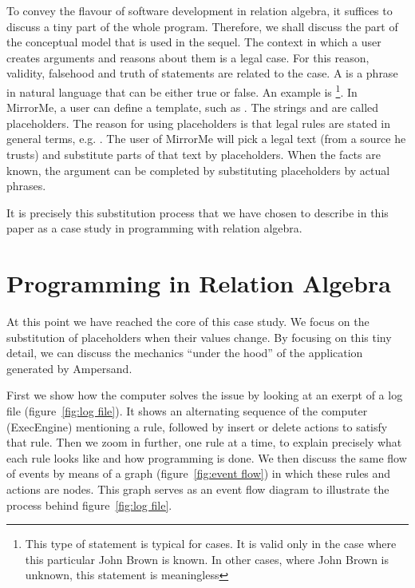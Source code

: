 \documentclass{elsarticle}
\begin{document}
	To convey the flavour of software development in relation algebra, it suffices to discuss a tiny part of the whole program.
	Therefore, we shall discuss the part of the conceptual model that is used in the sequel.
	The context in which a user creates arguments and reasons about them is a legal case.
	For this reason, validity, falsehood and truth of statements are related to the case.
	A  is a phrase in natural language that can be either true or false.
	An example is %
\footnote{This type of statement is typical for cases. It is valid only in the case where this particular John Brown is known.
	In other cases, where John Brown is unknown, this statement is meaningless}.
	In MirrorMe, a user can define a template, such as .
	The strings \stmtText{[emp]} and \stmtText{[increase]} are called placeholders.
	The reason for using placeholders is that legal rules are stated in general terms, e.g.
	.
	The user of MirrorMe will pick a legal text (from a source he trusts) and substitute parts of that text by placeholders.
	When the facts are known, the argument can be completed by substituting placeholders by actual phrases.

	It is precisely this substitution process that we have chosen to describe in this paper as a case study in
	programming with relation algebra.

\section{Programming in Relation Algebra}
\label{sct:Programming in RA}
	At this point we have reached the core of this case study.
	We focus on the substitution of placeholders when their values change.
	By focusing on this tiny detail, we can discuss the mechanics ``under the hood'' of the application generated by Ampersand.

	First we show how the computer solves the issue by looking at an exerpt of a log file (figure~\ref{fig:log file}).
	It shows an alternating sequence of the computer (ExecEngine) mentioning a rule,
	followed by insert or delete actions to satisfy that rule.
	Then we zoom in further, one rule at a time, to explain precisely what each rule looks like and how programming is done.
	We then discuss the same flow of events by means of a graph (figure~\ref{fig:event flow}) in which these rules and actions are nodes.
	This graph serves as an event flow diagram to illustrate the process behind figure~\ref{fig:log file}.
\end{document}
